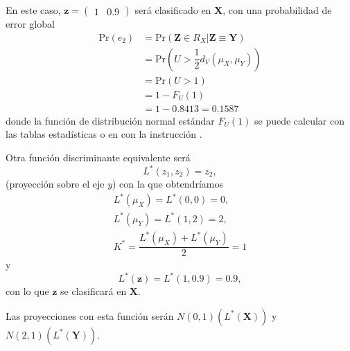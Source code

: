 En este caso, $\mathbf{z}=\begin{pmatrix}
1 & 0.9
\end{pmatrix}$ será clasificado en $\mathbf{X}$, con una probabilidad de error global \begin{align*}
\mathrm{Pr}(e_2)&=\mathrm{Pr}(\mathbf{Z}\in R_X|\mathbf{Z\equiv Y})\\
&=\mathrm{Pr}\left (U>\dfrac{1}{2}d_V(\mu_X,\mu_Y)\right )\\
&=\mathrm{Pr}(U>1)\\
&=1-F_U(1)\\
&=1-0.8413=0.1587
\end{align*}donde la función de distribución normal estándar $F_U(1)$ se puede calcular con las tablas estadísticas o en  con la instrucción .

Otra función discriminante equivalente será \[ L^*(z_1,z_2)=z_2, \](proyección sobre el eje $y$) con la que obtendríamos \[ \begin{array}{c}
L^*(\mu_X)=L^*(0,0)=0,\\
L^*(\mu_Y)=L^*(1,2)=2,\\
K^*=\dfrac{L^*(\mu_X)+L^*(\mu_Y)}{2}=1
\end{array} \]y\[ L^*(\mathbf{z})=L^*(1, 0.9)=0.9, \]con lo que $\mathbf{z}$ se clasificará en $\mathbf{X}$.

Las proyecciones con esta función serán $N(0,1)(L^*(\mathbf{X}))$ y $N(2,1)(L^*(\mathbf{Y}))$.

